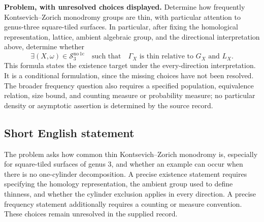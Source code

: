 \documentclass[11pt]{article}
\begin{document}
\textbf{Problem, with unresolved choices displayed.} Determine how frequently Kontsevich--Zorich monodromy groups are thin, with particular attention to genus-three square-tiled surfaces. In particular, after fixing the homological representation, lattice, ambient algebraic group, and the directional interpretation above, determine whether
\[
\exists (X,\omega)\in\mathcal S_3^{\mathrm{no\,1c}}
\quad\text{such that}\quad
\Gamma_X\text{ is thin relative to }G_X\text{ and }L_X.
\]
This formula states the existence target under the every-direction interpretation. It is a conditional formulation, since the missing choices have not been resolved. The broader frequency question also requires a specified population, equivalence relation, size bound, and counting measure or probability measure; no particular density or asymptotic assertion is determined by the source record.
\subsection{Short English statement}
The problem asks how common thin Kontsevich--Zorich monodromy is, especially for square-tiled surfaces of genus \(3\), and whether an example can occur when there is no one-cylinder decomposition. A precise existence statement requires specifying the homology representation, the ambient group used to define thinness, and whether the cylinder exclusion applies in every direction. A precise frequency statement additionally requires a counting or measure convention. These choices remain unresolved in the supplied record.
\end{document}
